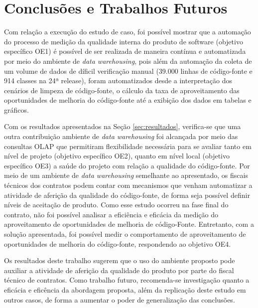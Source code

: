 \section{Conclusões e Trabalhos Futuros}


Com relação a execução do estudo de caso, foi possível mostrar que a automação do processo de medição da qualidade interna do produto de software (objetivo específico OE1)  é possível de ser realizada de maneira contínua e automatizada por meio do ambiente de \textit{data warehousing}, pois além da automação da coleta de um volume de dados de díficil verificação manual (39.000 linhas de código-fonte e 914 classes na 24ª release), foram automatizados desde a interpretação dos cenários de limpeza de código-fonte, o cálculo da taxa de aproveitamento das oportunidades de melhoria do código-fonte até a exibição dos dados em tabelas e gráficos.

Com os resultados apresentados na Seção \ref{sec:resultados}, verifica-se que uma outra contribuição ambiente de \textit{data warehousing} foi alcançada por meio das consultas OLAP que permitiram flexibilidade necessária para se avaliar tanto em nível de projeto (objetivo específico OE2), quanto em nível local (objetivo específico OE3) a saúde do projeto com relação a qualidade do código-fonte. Por meio de um ambiente de \textit{data warehousing} semelhante ao apresentado, os fiscais técnicos dos contratos podem contar com mecanismos que venham automatizar a atividade de aferição da qualidade do código-fonte, de forma seja possível definir níveis de aceitação de produto.
Como esse estudo ocorreu na fase final do contrato, não foi possível analisar a eficiência e eficácia da medição do aproveitamento de oportunidades de melhoria de código-Fonte. Entretanto, com a solução apresentada, foi possível medir o comportamento de aproveitamento de oportunidades de melhoria do código-fonte, respondendo ao objetivo OE4.

Os resultados deste trabalho sugerem que o uso do ambiente proposto pode auxiliar a atividade de aferição da qualidade do produto por parte do fiscal técnico de contratos. Como trabalho futuro, recomenda-se investigação quanto a eficácia e eficência da abordagem proposta, além da replicação deste estudo em outros casos, de forma a aumentar o poder de generalização das conclusões.